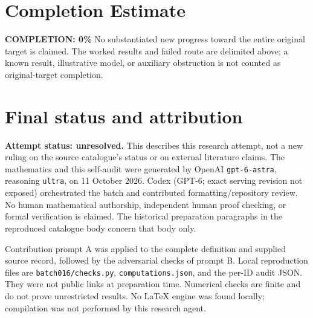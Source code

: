 \documentclass[11pt]{article}
\begin{document}
\section{Completion Estimate}
\noindent\textbf{COMPLETION: 0\%}
No substantiated new progress toward the entire original target is claimed. The worked results and failed route are delimited above; a known result, illustrative model, or auxiliary obstruction is not counted as original-target completion.

\section{Final status and attribution}
\textbf{Attempt status: unresolved.} This describes this research attempt, not a new ruling on the source catalogue's status or on external literature claims.
The mathematics and this self-audit were generated by OpenAI \texttt{gpt-6-astra}, reasoning \texttt{ultra}, on 11 October 2026. Codex (GPT-6; exact serving revision not exposed) orchestrated the batch and contributed formatting/repository review. No human mathematical authorship, independent human proof checking, or formal verification is claimed. The historical preparation paragraphs in the reproduced catalogue body concern that body only.

Contribution prompt A was applied to the complete definition and supplied source record, followed by the adversarial checks of prompt B. Local reproduction files are \texttt{batch016/checks.py}, \texttt{computations.json}, and the per-ID audit JSON. They were not public links at preparation time. Numerical checks are finite and do not prove unrestricted results. No LaTeX engine was found locally; compilation was not performed by this research agent.
\end{document}
